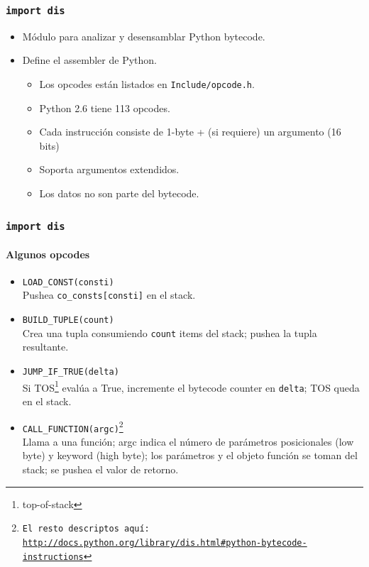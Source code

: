 \documentclass[9pt, notes=hide]{beamer}
\begin{document}
    \begin{frame}
        \frametitle{\texttt{import dis}}
        \begin{itemize}
            \item Módulo para analizar y desensamblar Python bytecode.
            \item Define el assembler de Python.
            \begin{itemize}
                \item Los opcodes están listados en \texttt{Include/opcode.h}.
                \item Python 2.6 tiene 113 opcodes.
                \item Cada instrucción consiste de 1-byte + (si requiere) un argumento (16 bits)
                \item Soporta argumentos extendidos.
                \item Los datos no son parte del bytecode.
            \end{itemize}
        \end{itemize}

    \end{frame}


    \begin{frame}
        \frametitle{\texttt{import dis}}
        \framesubtitle{Algunos opcodes}
        \begin{itemize}
            \item \texttt{LOAD\_CONST(consti)}\\
                    Pushea \texttt{co\_consts[consti]} en el stack.

            \item \texttt{BUILD\_TUPLE(count)}\\
                    Crea una tupla consumiendo \texttt{count} items del stack; pushea la tupla resultante.

            \item \texttt{JUMP\_IF\_TRUE(delta)}\\
                    Si TOS\footnote{top-of-stack} evalúa a True, incremente el bytecode counter en \texttt{delta}; TOS queda en el stack.

            \item \texttt{CALL\_FUNCTION(argc)\footnote{El resto descriptos aquí: \url{http://docs.python.org/library/dis.html\#python-bytecode-instructions}}}\\
                    Llama a una función; argc indica el número de parámetros posicionales (low byte) y keyword (high byte); los parámetros y el objeto función se toman del stack; se pushea el valor de retorno.

        \end{itemize}

    \end{frame}
\end{document}
